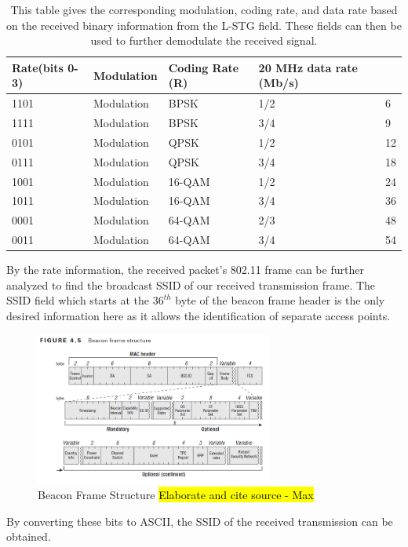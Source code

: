 \begin{table}[ht!]
	\centering
		\caption{This table gives the corresponding modulation, coding rate, and data rate based on the received binary information from the L-STG field. These fields can then be used to further demodulate the received signal.}
	\begin{tabular}{|l|l|l|l|l|}
		\hline
		Rate(bits 0-3) & Modulation & Coding Rate (R) & 20 MHz data rate (Mb/s) & \\
		\hline
		1101 & Modulation & BPSK & 1/2 & 6 \\
		1111 & Modulation & BPSK & 3/4 & 9 \\
		0101 & Modulation & QPSK & 1/2 & 12 \\
		0111 & Modulation & QPSK & 3/4 & 18 \\
		1001 & Modulation & 16-QAM & 1/2 & 24 \\
		1011 & Modulation & 16-QAM & 3/4 & 36 \\
		0001 & Modulation & 64-QAM & 2/3 & 48 \\
		0011 & Modulation & 64-QAM & 3/4 & 54 \\						
		\hline
	\end{tabular}
	\label{table:ofdm_rate_table}
\end{table} \par

By the rate information, the received packet's 802.11 frame can be further analyzed to find the broadcast SSID of our received transmission frame. The SSID field which starts at the $36^{th}$ byte of the beacon frame header is the only desired information here as it allows the identification of separate access points.
\begin{figure}[ht!]
	\centering
	\includegraphics[width=0.70\textwidth]{img/beacon_frame}
	\caption{Beacon Frame Structure \hl{Elaborate and cite source - Max}}
	\label{fig:beacon_frame}
\end{figure}\par
By converting these bits to ASCII, the SSID of the received transmission can be obtained. \par

